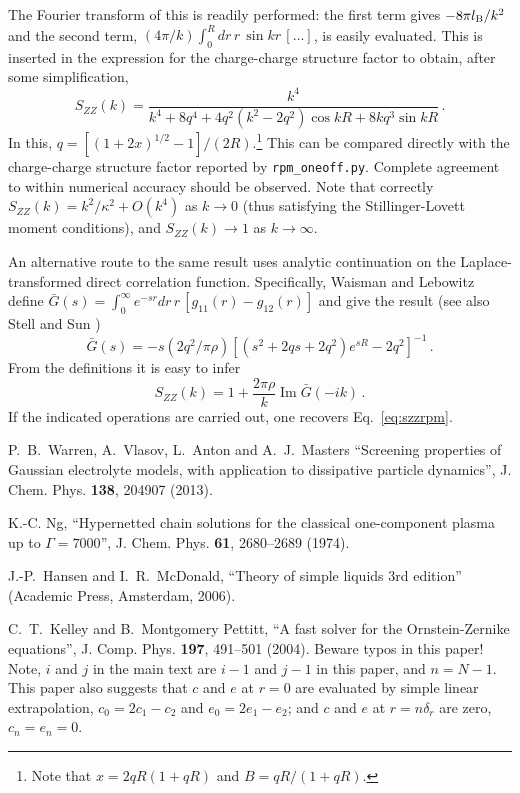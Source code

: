 \documentclass[12pt,a4paper]{article}
\DeclareMathOperator{\imaginary}{Im}
\newcommand{\Eqref}[1]{Eq.~\eqref{#1}}
\begin{document}
The Fourier transform of this is readily performed: the first term
gives $-8\pi l_{\mathrm{B}}/k^2$ and the second term, $(4\pi/k)\int_0^R
dr\,r\,\sin kr\,[\dots]$, is easily evaluated.  This is inserted in
the expression for the charge-charge structure factor to obtain, after
some simplification,
%
\begin{equation}
  S_{ZZ}(k)=\frac{k^4}{k^4+8q^4+4q^2(k^2-2q^2)\cos kR+8kq^3\sin kR}\,.
  \label{eq:szzrpm}
\end{equation}
%
In this, $q=[(1+2x)^{1/2}-1]/(2R)$.\footnote{Note that $x=2qR(1+qR)$
  and $B=qR/(1+qR)$.}  This can be compared directly with the
charge-charge structure factor reported by \verb+rpm_oneoff.py+.
Complete agreement to within numerical accuracy should be observed.
Note that correctly $S_{ZZ}(k)=k^2/\kappa^2+O(k^4)$ as $k\to0$ (thus
satisfying the Stillinger-Lovett moment conditions), and
$S_{ZZ}(k)\to1$ as $k\to\infty$.

An alternative route to the same result uses analytic continuation on
the Laplace-transformed direct correlation function.  Specifically,
Waisman and Lebowitz \cite{WL72} define $\bar G(s)=\int_0^\infty
e^{-sr} dr\,r\, [g_{11}(r)-g_{12}(r)]$ and give the result (see also
Stell and Sun \cite{SS75})
%
\begin{equation}
  \bar G(s)=-s(2q^2/\pi\rho)[(s^2+2qs+2q^2)e^{sR}-2q^2]^{-1}\,.
\end{equation}
%
From the definitions it is easy to infer
%
\begin{equation}
  S_{ZZ}(k)=1+\frac{2\pi\rho}{k}\imaginary \bar G(-ik)\,.
\end{equation}
%
If the indicated operations are carried out, one recovers
\Eqref{eq:szzrpm}.

\thebibliography{}

 P.~B.~Warren, A.~Vlasov, L.~Anton and A.~J.~Masters
  ``Screening properties of Gaussian electrolyte models, with
  application to dissipative particle dynamics'',
  J. Chem. Phys. {\bf138}, 204907 (2013).

 K.-C. Ng, ``Hypernetted chain solutions for the
  classical one-component plasma up to $\Gamma=7000$'',
  J. Chem. Phys. {\bf61}, 2680--2689 (1974).

 J.-P.~Hansen and I.~R.~McDonald, ``Theory of simple
  liquids 3rd edition'' (Academic Press, Amsterdam, 2006).

 C.~T.~Kelley and B.~Montgomery Pettitt, ``A fast
  solver for the Ornstein-Zernike equations'',
  J. Comp. Phys. {\bf197}, 491--501 (2004).  Beware typos in this
  paper!  Note, $i$ and $j$ in the main text are $i-1$ and $j-1$ in
  this paper, and $n = N-1$.  This paper also suggests that $c$ and
  $e$ at $r = 0$ are evaluated by simple linear extrapolation, $c_0 =
  2 c_1 - c_2$ and $e_0 = 2 e_1 - e_2$; and $c$ and $e$ at $r =
  n\delta_r$ are zero, $c_n = e_n = 0$.
\end{document}
